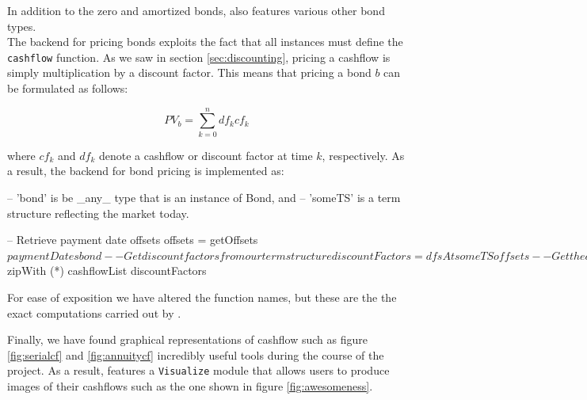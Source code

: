 In addition to the zero and amortized bonds, \hql also features various other
bond types\cite{hqldoc}.\\

The backend for pricing bonds exploits the fact that all instances must define
the \texttt{cashflow} function. As we saw in section \ref{sec:discounting},
pricing a cashflow is simply multiplication by a discount factor. This means
that pricing a bond $b$ can be formulated as follows:

\begin{equation}
PV_b = \sum_{k=0}^n df_k cf_k
\end{equation}

where $cf_k$ and $df_k$ denote a cashflow or discount factor at time $k$,
respectively. As a result, the backend for bond pricing is implemented as:

\begin{hscode}
-- 'bond' is be _any_ type that is an instance of Bond, and 
-- 'someTS' is a term structure reflecting the market today.

-- Retrieve payment date offsets
offsets = getOffsets $ paymentDates bond 

-- Get discount factors from our term structure
discountFactors = dfsAt someTS offsets

-- Get the cashflow of the bond
cashflowList    = cashflow bond

-- Price it!
pv = sum $ zipWith (*) cashflowList discountFactors
\end{hscode}

For ease of exposition we have altered the function names, but these are the 
the exact computations carried out by \hql.\

Finally, we have found graphical representations of cashflow such as figure
\ref{fig:serialcf} and \ref{fig:annuitycf} incredibly useful tools during
the course of the project. As a result, \hql features a \texttt{Visualize}
module that allows users to produce images of their cashflows such as the 
one shown in figure \ref{fig:awesomeness}.

